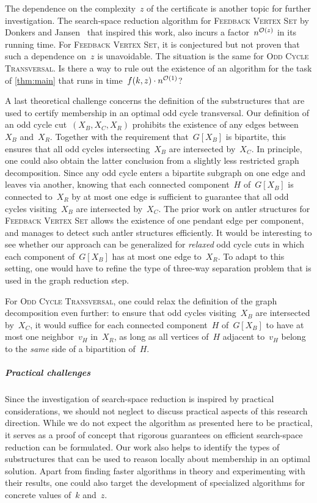 The dependence on the complexity~$z$ of the certificate is another topic for further investigation. The search-space reduction algorithm for \textsc{Feedback Vertex Set} by Donkers and Jansen~\cite{DonkersJ24} that inspired this work, also incurs a factor~$n^{\mathcal{O}(z)}$ in its running time. For \textsc{Feedback Vertex Set}, it is conjectured but not proven that such a dependence on~$z$ is unavoidable. The situation is the same for \textsc{Odd Cycle Transversal}. Is there a way to rule out the existence of an algorithm for the task of \cref{thm:main} that runs in time~$f(k, z) \cdot n^{\mathcal{O}(1)}$?

A last theoretical challenge concerns the definition of the substructures that are used to certify membership in an optimal odd cycle transversal. Our definition of an odd cycle cut~$(X_B, X_C, X_R)$ prohibits the existence of any edges between~$X_B$ and~$X_R$. Together with the requirement that~$G[X_B]$ is bipartite, this ensures that all odd cycles intersecting~$X_B$ are intersected by~$X_C$. In principle, one could also obtain the latter conclusion from a slightly less restricted graph decomposition. Since any odd cycle enters a bipartite subgraph on one edge and leaves via another, knowing that each connected component~$H$ of~$G[X_B]$ is connected to~$X_R$ by at most one edge is sufficient to guarantee that all odd cycles visiting~$X_B$ are intersected by~$X_C$. The prior work on antler structures for \textsc{Feedback Vertex Set} allows the existence of one pendant edge per component, and manages to detect such antler structures efficiently. It would be interesting to see whether our approach can be generalized for \emph{relaxed} odd cycle cuts in which each component of~$G[X_B]$ has at most one edge to~$X_R$. To adapt to this setting, one would have to refine the type of three-way separation problem that is used in the graph reduction step. 

For \textsc{Odd Cycle Transversal}, one could relax the definition of the graph decomposition even further: to ensure that odd cycles visiting~$X_B$ are intersected by~$X_C$, it would suffice for each connected component~$H$ of~$G[X_B]$ to have at most one neighbor~$v_H$ in~$X_R$, as long as all vertices of~$H$ adjacent to~$v_H$ belong to the \emph{same} side of a bipartition of~$H$.

\subparagraph*{Practical challenges}
Since the investigation of search-space reduction is inspired by practical considerations, we should not neglect to discuss practical aspects of this research direction. While we do not expect the algorithm as presented here to be practical, it serves as a proof of concept that rigorous guarantees on efficient search-space reduction can be formulated. Our work also helps to identify the types of substructures that can be used to reason locally about membership in an optimal solution. Apart from finding faster algorithms in theory and experimenting with their results, one could also target the development of specialized algorithms for concrete values of~$k$ and~$z$. 

